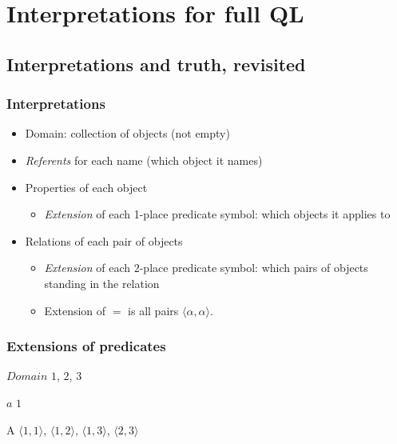 ﻿%

\setcounter{section}{10}
\section{Interpretations for full QL}

\subsection{Interpretations and truth, revisited}

\begin{frame}
\frametitle{Interpretations}

\begin{itemize}[<+->]
\item Domain: collection of objects (not empty)
\item \emph{Referents} for each name (which object it names)
\item Properties of each object
  \begin{itemize}
  \item \emph{Extension} of each 1-place predicate symbol: which
  objects it applies to
  \end{itemize}
\item Relations of each pair of objects
\begin{itemize}
\item \emph{Extension} of each $2$-place predicate symbol: which pairs of
  objects standing in the relation
\item Extension of $=$ is all pairs $\langle\alpha, \alpha\rangle$.
\end{itemize}
\end{itemize}

\end{frame}

\begin{frame}
\frametitle{Extensions of predicates}

\begin{ekey}
\item[$Domain$] $1$, $2$, $3$
\item[$a$] $1$
\item[A\qr{x}{y}] $\langle 1, 1\rangle$, $\langle 1,2\rangle$, $\langle 1,3\rangle$, $\langle 2,3\rangle$
\end{ekey}
\usetikzlibrary{arrows}
\hfill{}
\end{frame}

